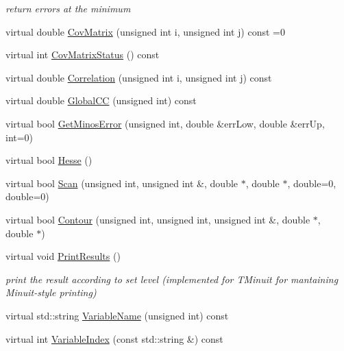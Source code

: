 \begin{DoxyCompactItemize}
\begin{DoxyCompactList}\small\item\em return errors at the minimum \end{DoxyCompactList}\item 
virtual double \mbox{\hyperlink{classROOT_1_1Math_1_1Minimizer_a01b0ec371972dab12ca3b9c962d952f8}{Cov\+Matrix}} (unsigned int i, unsigned int j) const =0
\item 
virtual int \mbox{\hyperlink{classROOT_1_1Math_1_1Minimizer_a5f5eab490760ff361d9c44369e9d754d}{Cov\+Matrix\+Status}} () const
\item 
virtual double \mbox{\hyperlink{classROOT_1_1Math_1_1Minimizer_a9ba2f4bc3c8c0e905f2c018e79809c0e}{Correlation}} (unsigned int i, unsigned int j) const
\item 
virtual double \mbox{\hyperlink{classROOT_1_1Math_1_1Minimizer_a6b50b0b0ccb0cb23da281ef978d145c5}{Global\+CC}} (unsigned int) const
\item 
virtual bool \mbox{\hyperlink{classROOT_1_1Math_1_1Minimizer_aeaef75b766eff7088939259c842ab056}{Get\+Minos\+Error}} (unsigned int, double \&err\+Low, double \&err\+Up, int=0)
\item 
virtual bool \mbox{\hyperlink{classROOT_1_1Math_1_1Minimizer_ae903e5936bef4ea7fac3301f9cdc50be}{Hesse}} ()
\item 
virtual bool \mbox{\hyperlink{classROOT_1_1Math_1_1Minimizer_a1e6e4b32d7338a7a08791cff67f54080}{Scan}} (unsigned int, unsigned int \&, double $\ast$, double $\ast$, double=0, double=0)
\item 
virtual bool \mbox{\hyperlink{classROOT_1_1Math_1_1Minimizer_aeb8855190ff2e37911c38ed839f2043c}{Contour}} (unsigned int, unsigned int, unsigned int \&, double $\ast$, double $\ast$)
\item 
virtual void \mbox{\hyperlink{classROOT_1_1Math_1_1Minimizer_aea1c5d69c6a1c1f2cf4d17a523862560}{Print\+Results}} ()
\begin{DoxyCompactList}\small\item\em print the result according to set level (implemented for T\+Minuit for mantaining Minuit-\/style printing) \end{DoxyCompactList}\item 
virtual std\+::string \mbox{\hyperlink{classROOT_1_1Math_1_1Minimizer_a4d6a3c9c95608b35a25f16afd50690ad}{Variable\+Name}} (unsigned int) const
\item 
virtual int \mbox{\hyperlink{classROOT_1_1Math_1_1Minimizer_a5f7ff3bdda1f4b1d9e5e1150091a86c5}{Variable\+Index}} (const std\+::string \&) const

\end{DoxyCompactItemize}
